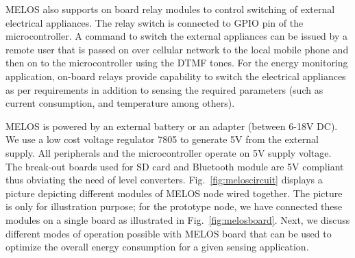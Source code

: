 \documentclass[10pt]{sigplan-proc-varsize}
\newcommand{\figref}[1]{Fig.~\ref{#1}}
\newcommand{\melos}{MELOS }
\begin{document}
\melos also supports on board relay modules to control switching of external electrical appliances. The relay switch is connected to GPIO pin of the microcontroller. A command to switch the external appliances can be issued by a remote user that is passed on over cellular network to the local mobile phone and then on to the microcontroller using the DTMF tones. For the energy monitoring application, on-board relays provide capability to switch the electrical appliances as per requirements in addition to sensing the required parameters (such as current consumption, and temperature among others).  

\melos is powered by an external battery or an adapter (between 6-18V DC). We use a low cost voltage regulator 7805 to generate 5V from the external supply. All peripherals and the microcontroller operate on 5V supply voltage. The break-out boards used for SD card and Bluetooth module are 5V compliant thus obviating the need of level converters. \figref{fig:meloscircuit} displays a picture depicting different modules of \melos node wired together. The picture is only for illustration purpose; for the prototype node, we have connected these modules on a single board as illustrated in \figref{fig:melosboard}. Next,  we discuss different modes of operation possible with \melos board that can be used to optimize the overall energy consumption for a given sensing application.
\end{document}
